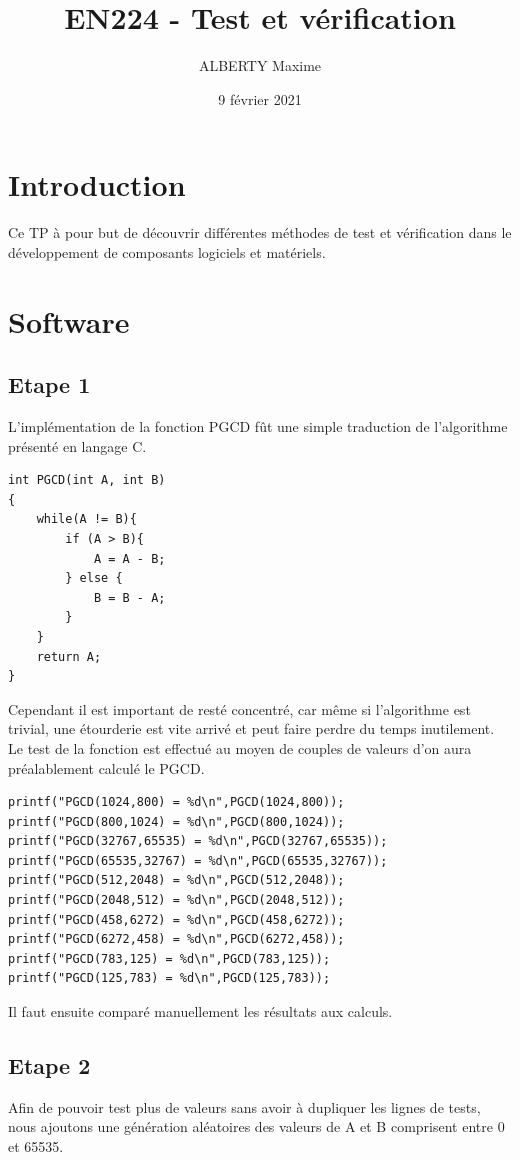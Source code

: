 \documentclass[a4paper]{article}
\title{EN224 - Test et vérification}
\author{ALBERTY Maxime}
\date{9 février 2021}
\begin{document}
\maketitle

\tableofcontents

\newpage %

\section{Introduction}
    Ce TP à pour but de découvrir différentes méthodes de test et vérification dans le développement de composants logiciels et matériels.
\section{Software}
    \subsection{Etape 1}
        L'implémentation de la fonction PGCD fût une simple traduction de l'algorithme présenté en langage C.
\begin{lstlisting}[style=CStyle]
int PGCD(int A, int B)
{
	while(A != B){
		if (A > B){
			A = A - B;
		} else {
			B = B - A;
		}
	}
	return A;
}
 \end{lstlisting}
        
        Cependant il est important de resté concentré, car même si l'algorithme est trivial, une étourderie est vite arrivé et peut faire perdre du temps inutilement.
        \\
        
        Le test de la fonction est effectué au moyen de couples de valeurs d'on aura préalablement calculé le PGCD. 
\begin{lstlisting}[style=CStyle]
printf("PGCD(1024,800) = %d\n",PGCD(1024,800));
printf("PGCD(800,1024) = %d\n",PGCD(800,1024));
printf("PGCD(32767,65535) = %d\n",PGCD(32767,65535));
printf("PGCD(65535,32767) = %d\n",PGCD(65535,32767));
printf("PGCD(512,2048) = %d\n",PGCD(512,2048));
printf("PGCD(2048,512) = %d\n",PGCD(2048,512));
printf("PGCD(458,6272) = %d\n",PGCD(458,6272));
printf("PGCD(6272,458) = %d\n",PGCD(6272,458));
printf("PGCD(783,125) = %d\n",PGCD(783,125));
printf("PGCD(125,783) = %d\n",PGCD(125,783));
\end{lstlisting}
        Il faut ensuite comparé manuellement les résultats aux calculs.
        
        
    \subsection{Etape 2}
        Afin de pouvoir test plus de valeurs sans avoir à dupliquer les lignes de tests, nous ajoutons une génération aléatoires des valeurs de A et B comprisent entre 0 et 65535.
        
\end{document}
